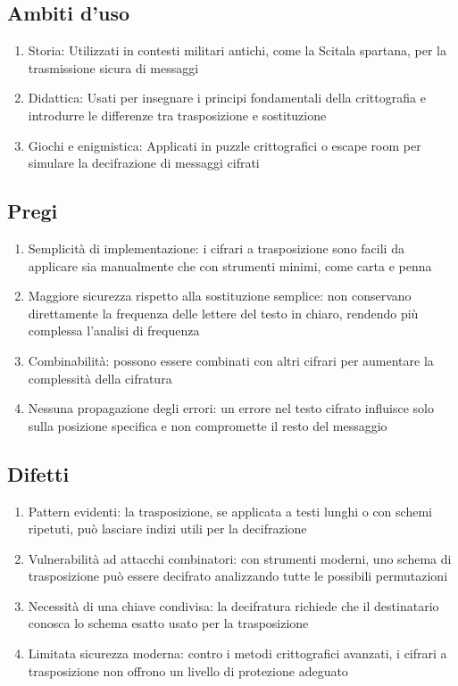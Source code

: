 \documentclass[10pt,oneside,a4paper]{article}
\begin{document}
\subsection{Ambiti d'uso}
\begin{enumerate}
\item Storia: Utilizzati in contesti militari antichi, come la Scitala spartana, per la trasmissione sicura di messaggi
\item Didattica: Usati per insegnare i principi fondamentali della crittografia e introdurre le differenze tra trasposizione e sostituzione
\item Giochi e enigmistica: Applicati in puzzle crittografici o escape room per simulare la decifrazione di messaggi cifrati
\end{enumerate}
\subsection{Pregi}
\begin{enumerate}
\item Semplicità di implementazione: i cifrari a trasposizione sono facili da applicare sia manualmente che con strumenti minimi, come carta e penna
\item Maggiore sicurezza rispetto alla sostituzione semplice: non conservano direttamente la frequenza delle lettere del testo in chiaro, rendendo più complessa l'analisi di frequenza
\item Combinabilità: possono essere combinati con altri cifrari per aumentare la complessità della cifratura
\item Nessuna propagazione degli errori: un errore nel testo cifrato influisce solo sulla posizione specifica e non compromette il resto del messaggio
\end{enumerate}
\subsection{Difetti}
\begin{enumerate}
\item Pattern evidenti: la trasposizione, se applicata a testi lunghi o con schemi ripetuti, può lasciare indizi utili per la decifrazione
\item Vulnerabilità ad attacchi combinatori: con strumenti moderni, uno schema di trasposizione può essere decifrato analizzando tutte le possibili permutazioni
\item Necessità di una chiave condivisa: la decifratura richiede che il destinatario conosca lo schema esatto usato per la trasposizione
\item Limitata sicurezza moderna: contro i metodi crittografici avanzati, i cifrari a trasposizione non offrono un livello di protezione adeguato
\end{enumerate}
\end{document}
